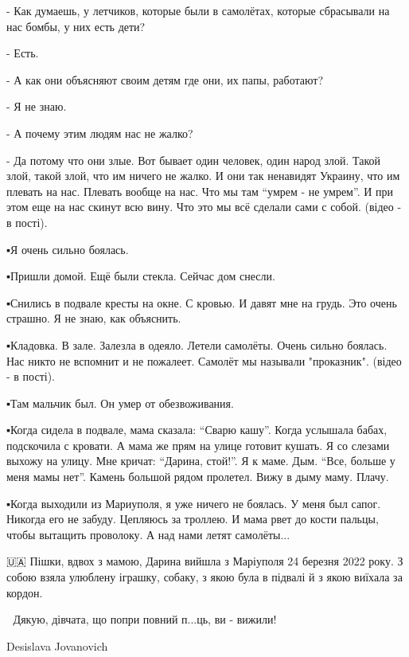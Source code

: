 - Как думаешь, у летчиков, которые были в самолётах, которые сбрасывали на нас
бомбы, у них есть дети? 

- Есть. 

- А как они объясняют своим детям где они, их папы, работают? 

- Я не знаю. 

- А почему этим людям нас не жалко? 

- Да потому что они злые. Вот бывает один человек, один народ злой. Такой злой,
такой злой, что им ничего не жалко. И они так ненавидят Украину, что им плевать
на нас. Плевать вообще на нас. Что мы там \enquote{умрем - не умрем}.  И при этом еще
на нас скинут всю вину. Что это мы всё сделали сами с собой. (відео - в пості).

▪️Я очень сильно боялась. 

▪️Пришли домой. Ещё были стекла. Сейчас дом снесли. 

▪️Снились в подвале кресты на окне. С кровью. И давят мне на грудь. Это очень
страшно. Я не знаю, как объяснить. 

▪️Кладовка. В зале. Залезла в одеяло. Летели самолёты. Очень сильно боялась. Нас
никто не вспомнит и не пожалеет. Самолёт мы называли "проказник". (відео - в
пості).

▪️Там мальчик был. Он умер от обезвоживания. 

▪️Когда сидела в подвале, мама сказала: \enquote{Сварю кашу}. Когда услышала бабах,
подскочила с кровати. А мама же прям на улице готовит кушать. Я со слезами
выхожу на улицу. Мне кричат: \enquote{Дарина, стой!}. Я к маме. Дым. \enquote{Все, больше у
меня мамы нет}. Камень большой рядом пролетел. Вижу в дыму маму. Плачу. 

▪️Когда выходили из Мариуполя, я уже ничего не боялась. У меня был сапог.
Никогда его не забуду. Цепляюсь за троллею. И мама рвет до кости пальцы, чтобы
вытащить проволоку. А над нами летят самолёты... 

🇺🇦 Пішки, вдвох з мамою, Дарина вийшла з Маріуполя 24 березня 2022 року. З
собою взяла улюблену іграшку, собаку, з якою була в підвалі й з якою виїхала за
кордон. 

💞 Дякую, дівчата, що попри повний п...ць, ви - вижили!

Desislava Jovanovich
